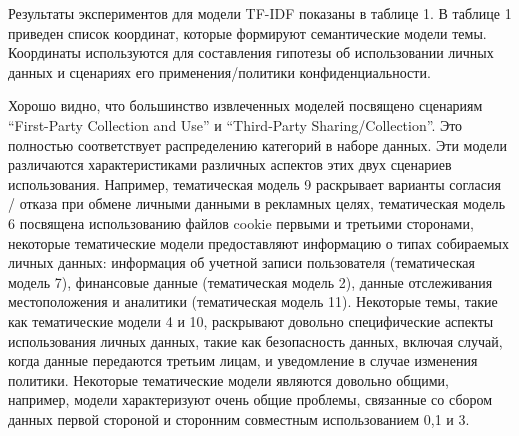 \documentclass[../main]{subfiles}
\begin{document}
Результаты экспериментов для модели TF-IDF показаны в таблице 1. В таблице 1 приведен список координат, которые формируют семантические модели темы. Координаты используются для составления гипотезы об использовании личных данных и сценариях его применения/политики конфиденциальности.

Хорошо видно, что большинство извлеченных моделей посвящено сценариям “First-Party Collection and Use” и “Third-Party Sharing/Collection”. Это полностью соответствует распределению категорий в наборе данных. Эти модели различаются характеристиками различных аспектов этих двух сценариев использования. Например, тематическая модель 9 раскрывает варианты согласия / отказа при обмене личными данными в рекламных целях, тематическая модель 6 посвящена использованию файлов cookie первыми и третьими сторонами, некоторые тематические модели предоставляют информацию о типах собираемых личных данных: информация об учетной записи пользователя (тематическая модель 7), финансовые данные (тематическая модель 2), данные отслеживания местоположения и аналитики (тематическая модель 11). Некоторые темы, такие как тематические модели 4 и 10, раскрывают довольно специфические аспекты использования личных данных, такие как безопасность данных, включая случай, когда данные передаются третьим лицам, и уведомление в случае изменения политики. Некоторые тематические модели являются довольно общими, например, модели характеризуют очень общие проблемы, связанные со сбором данных первой стороной и сторонним совместным использованием 0,1 и 3.
\end{document}
